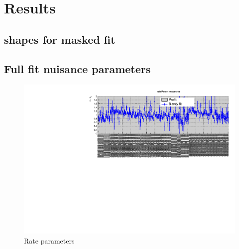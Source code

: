 \section{Results}
\label{app:results}

\subsection{\texorpdfstring{\mht}{MHT} shapes for masked fit }
\label{app:mhtshapes}



%
%

\clearpage
\subsection{Full fit nuisance parameters}
\label{app:nuispost}

\begin{figure}[h!]
  \centering
  \caption{Rate parameters}
  \includegraphics[width=1.\linewidth]{figures/results/36invfb_freeze/postfit/nuis/Rates_nuisances}
\end{figure}

